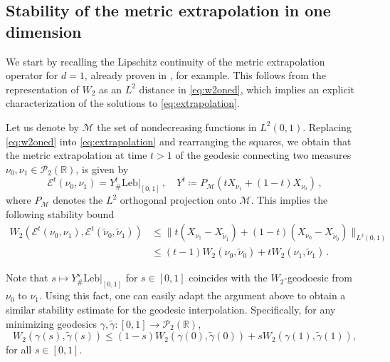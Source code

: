 \documentclass[12pt]{amsart}
\def\mc#1{\mathcal{#1}}
\begin{document}
\subsection{Stability of the metric extrapolation in one dimension} \label{sec:extrastab} We start by recalling the Lipschitz continuity of the metric extrapolation operator for $d=1$, already proven in \cite{tornabene2024generalized}, for example. 
This follows from the representation of $W_2$ as an $L^2$ distance in \eqref{eq:w2oned}, which implies an explicit characterization of the solutions to \eqref{eq:extrapolation}.

Let us denote  by $\mc{M}$ the set of nondecreasing functions in $L^2(0,1)$.  Replacing \eqref{eq:w2oned} into \eqref{eq:extrapolation} and rearranging the squares, we obtain that the metric extrapolation at time $t>1$ of the geodesic connecting two  measures $\nu_0,\nu_1 \in \mathcal{P}_2(\mathbb{R})$, is given by
\[
\mathscr{E}^t(\nu_0,\nu_1) = Y^t_\# \mathrm{Leb}|_{[0,1]} \,, \quad  Y^t\coloneqq P_{\mathcal{M}}( t X_{\nu_1} + (1-t) X_{\nu_0})\,,
\]
where $P_{\mc M}$ denotes the $L^2$ orthogonal projection onto $\mc{M}$.  
This implies the following stability bound 
\begin{align}\label{eq:1d-stablility-extra}                 W_2(\mathscr{E}^t(\nu_0,\nu_1),\mathscr{E}^t(\tilde{\nu}_0,\tilde{\nu}_1))& \leq \| t(X_{\nu_1} - X_{\tilde{\nu}_1}) + (1-t)(X_{\nu_0} - X_{\tilde{\nu}_0})\|_{L^2(0,1)}\\\nonumber &\leq   (t-1) W_2(\nu_0,\tilde{\nu}_0) + tW_2(\nu_1,\tilde{\nu}_1)\,.
\end{align}

{Note that $ s\mapsto Y^s_\# \mathrm{Leb}|_{[0,1]}$ for $s\in[0,1]$ coincides with the $W_2$-geodoesic from $\nu_0$ to $\nu_1$. Using this fact, one can easily adapt the argument above to obtain a similar stability estimate for the geodesic interpolation. Specifically, for any minimizing geodesics $\gamma,\tilde{\gamma}:[0,1] \rightarrow \mc{P}_2(\mathbb{R})$,
\begin{equation}\label{eq:interpolation}
W_2(\gamma(s),\tilde{\gamma}(s))\leq (1-s) W_2(\gamma(0), \tilde{\gamma}(0)) + s W_2(\gamma(1),\tilde{\gamma}(1)),
\end{equation}
for all $s\in[0,1]$.
}
\end{document}
